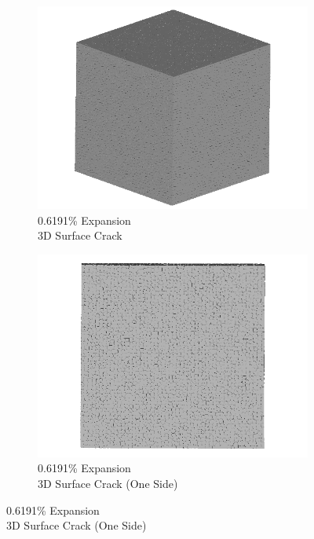 \begin{figure}[ht!]
    \begin{subfigure}{.5\textwidth}
      \centering
      \includegraphics[width=0.5\linewidth]{Files/exp_3D/DEF/A30X-1C_3_3d.png}
      \caption{0.6191\% Expansion\\3D Surface Crack}
    \end{subfigure}%
    \begin{subfigure}{.5\textwidth}
      \centering
      \includegraphics[width=0.5\linewidth]{Files/exp_3D/DEF/A30X-1C_3_3ds.png}
      \caption{0.6191\% Expansion\\3D Surface Crack (One Side)}
    \end{subfigure}%


\end{figure}
